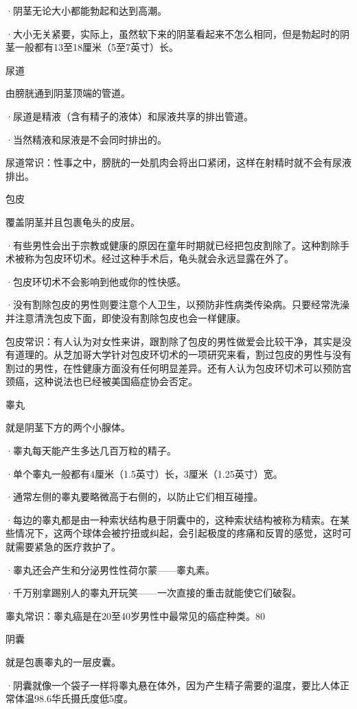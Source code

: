 \documentclass[12pt,UTF8,openany]{ctexbook}
\begin{document}
·阴茎无论大小都能勃起和达到高潮。

·大小无关紧要，实际上，虽然软下来的阴茎看起来不怎么相同，但是勃起时的阴茎一般都有13至18厘米（5至7英寸）长。

尿道

由膀胱通到阴茎顶端的管道。

·尿道是精液（含有精子的液体）和尿液共享的排出管道。

·当然精液和尿液是不会同时排出的。

尿道常识：性事之中，膀胱的一处肌肉会将出口紧闭，这样在射精时就不会有尿液排出。

包皮

覆盖阴茎并且包裹龟头的皮层。

·有些男性会出于宗教或健康的原因在童年时期就已经把包皮割除了。这种割除手术被称为包皮环切术。经过这种手术后，龟头就会永远显露在外了。

·包皮环切术不会影响到他或你的性快感。

·没有割除包皮的男性则要注意个人卫生，以预防非性病类传染病。只要经常洗澡并注意清洗包皮下面，即使没有割除包皮也会一样健康。

包皮常识：有人认为对女性来讲，跟割除了包皮的男性做爱会比较干净，其实是没有道理的。从芝加哥大学针对包皮环切术的一项研究来看，割过包皮的男性与没有割过的男性，在性健康方面没有任何明显差异。还有人认为包皮环切术可以预防宫颈癌，这种说法也已经被美国癌症协会否定。

睾丸

就是阴茎下方的两个小腺体。

·睾丸每天能产生多达几百万粒的精子。

·单个睾丸一般都有4厘米（1.5英寸）长，3厘米（1.25英寸）宽。

·通常左侧的睾丸要略微高于右侧的，以防止它们相互碰撞。

·每边的睾丸都是由一种索状结构悬于阴囊中的，这种索状结构被称为精索。在某些情况下，这两个球体会被拧扭或纠起，会引起极度的疼痛和反胃的感觉，这时可就需要紧急的医疗救护了。

·睾丸还会产生和分泌男性性荷尔蒙——睾丸素。

·千万别拿踢别人的睾丸开玩笑——一次直接的重击就能使它们破裂。

睾丸常识：睾丸癌是在20至40岁男性中最常见的癌症种类。80%

阴囊

就是包裹睾丸的一层皮囊。

·阴囊就像一个袋子一样将睾丸悬在体外，因为产生精子需要的温度，要比人体正常体温98.6华氏摄氏度低5度。
\end{document}
